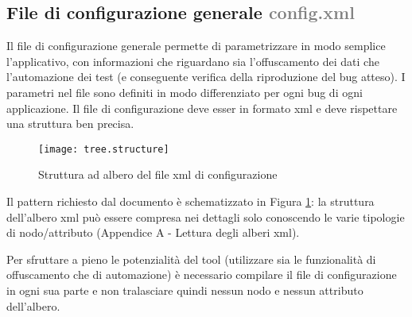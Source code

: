 \subsection*{File di configurazione generale \textcolor{gray}{config.xml} }
\label{filconfiggeneral}
Il file di configurazione generale permette di parametrizzare in modo semplice l'applicativo, con informazioni che riguardano sia l'offuscamento dei dati che l'automazione dei test (e conseguente verifica della riproduzione del bug atteso). I parametri nel file sono definiti in modo differenziato per ogni bug di ogni applicazione.  Il file di configurazione deve esser in formato xml e deve rispettare una struttura ben precisa.
\begin{figure}[H]
	\texttt{[image: tree.structure]}
	\centering
	\caption{Struttura ad albero del file xml di configurazione}%
    \label{fig:configstructure}
\end{figure}
\noindent Il pattern richiesto dal documento è schematizzato in  Figura \ref{fig:configstructure}: la struttura dell'albero xml può essere compresa nei dettagli solo conoscendo le varie tipologie di nodo/attributo (Appendice A - Lettura degli alberi xml).


\noindent Per sfruttare a pieno le potenzialità del tool (utilizzare sia le funzionalità di offuscamento che di automazione) è necessario compilare il file di configurazione in ogni sua parte e non tralasciare quindi nessun nodo e nessun attributo dell'albero. 

